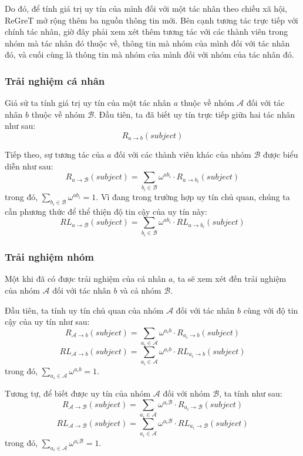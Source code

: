 Do đó, để tính giá trị uy tín của mình đối với một tác nhân theo chiều xã hội, ReGreT mở rộng thêm ba nguồn thông tin mới. Bên cạnh tương tác trực tiếp với chính tác nhân, giờ đây phải xem xét thêm
tương tác với các thành viên trong nhóm mà tác nhân đó thuộc về, thông tin mà nhóm của mình đối với tác nhân đó, và cuối cùng là thông tin mà nhóm của mình đối với nhóm của tác nhân đó.

\subsubsection{Trải nghiệm cá nhân}

Giả sử ta tính giá trị uy tín của một tác nhân $a$ thuộc về nhóm $\mathcal{A}$ đối với tác nhân $b$ thuộc về nhóm $\mathcal{B}$.
Đầu tiên, ta đã biết uy tín trực tiếp giữa hai tác nhân như sau:
\[R_{a \rightarrow b}(subject)\]

Tiếp theo, sự tương tác của $a$ đối với các thành viên khác của nhóm $\mathcal{B}$ được biểu diễn như sau:
\[R_{a \rightarrow \mathcal{B}}(subject)=\sum_{b_i \in \mathcal{B}} \omega^{ab_i} \cdot R_{a \rightarrow b_i}(subject)\]
trong đó, $\sum_{b_i \in \mathcal{B}} \omega^{ab_i} = 1$. Vì đang trong trường hợp uy tín chủ quan, chúng ta cần
phương thức để thể thiện độ tin cậy của uy tín này:
\[RL_{a \rightarrow \mathcal{B}}(subject)=\sum_{b_i \in \mathcal{B}} \omega^{ab_i} \cdot RL_{a \rightarrow b_i}(subject)\]

\subsubsection{Trải nghiệm nhóm}

Một khi đã có được trải nghiệm của cá nhân $a$, ta sẽ xem xét đến trải nghiệm của nhóm $\mathcal{A}$ đối với tác nhân $b$ và cả nhóm $\mathcal{B}$.

Đầu tiên, ta tính uy tín chủ quan của nhóm $\mathcal{A}$ đối với tác nhân $b$ cùng với độ tin cậy của uy tín như sau:
\[R_{\mathcal{A} \rightarrow b}(subject)=\sum_{a_i \in \mathcal{A}} \omega^{a_ib} \cdot R_{a_i \rightarrow b}(subject)\]
\[RL_{\mathcal{A} \rightarrow b}(subject)=\sum_{a_i \in \mathcal{A}} \omega^{a_ib} \cdot RL_{a_i \rightarrow b}(subject)\]
trong đó, $\sum_{a_i \in \mathcal{A}} \omega^{a_ib} = 1$.

Tương tự, để biết được uy tín của nhóm $\mathcal{A}$ đối với nhóm $\mathcal{B}$, ta tính như sau:
\[R_{\mathcal{A} \rightarrow \mathcal{B}}(subject)=\sum_{a_i \in \mathcal{A}} \omega^{a_i\mathcal{B}} \cdot R_{a_i \rightarrow \mathcal{B}}(subject)\]
\[RL_{\mathcal{A} \rightarrow \mathcal{B}}(subject)=\sum_{a_i \in \mathcal{A}} \omega^{a_i\mathcal{B}} \cdot RL_{a_i \rightarrow \mathcal{B}}(subject)\]
trong đó, $\sum_{a_i \in \mathcal{A}} \omega^{a_i\mathcal{B}} = 1$.

